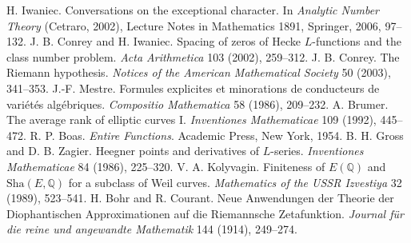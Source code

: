  H. Iwaniec. Conversations on the exceptional character. In \emph{Analytic Number Theory} (Cetraro, 2002), Lecture Notes in Mathematics 1891, Springer, 2006, 97--132. %
 J. B. Conrey and H. Iwaniec. Spacing of zeros of Hecke $L$-functions and the class number problem. \emph{Acta Arithmetica} 103 (2002), 259--312. %
 J. B. Conrey. The Riemann hypothesis. \emph{Notices of the American Mathematical Society} 50 (2003), 341--353. %
 J.-F. Mestre. Formules explicites et minorations de conducteurs de vari\'et\'es alg\'ebriques. \emph{Compositio Mathematica} 58 (1986), 209--232. %
 A. Brumer. The average rank of elliptic curves I. \emph{Inventiones Mathematicae} 109 (1992), 445--472. %
 R. P. Boas. \emph{Entire Functions}. Academic Press, New York, 1954. %
 B. H. Gross and D. B. Zagier. Heegner points and derivatives of $L$-series. \emph{Inventiones Mathematicae} 84 (1986), 225--320. %
 V. A. Kolyvagin. Finiteness of $E(\mathbb Q)$ and $\mathrm{Sha}(E,\mathbb Q)$ for a subclass of Weil curves. \emph{Mathematics of the USSR Izvestiya} 32 (1989), 523--541. %
 H. Bohr and R. Courant. Neue Anwendungen der Theorie der Diophantischen Approximationen auf die Riemannsche Zetafunktion. \emph{Journal f\"ur die reine und angewandte Mathematik} 144 (1914), 249--274. %

